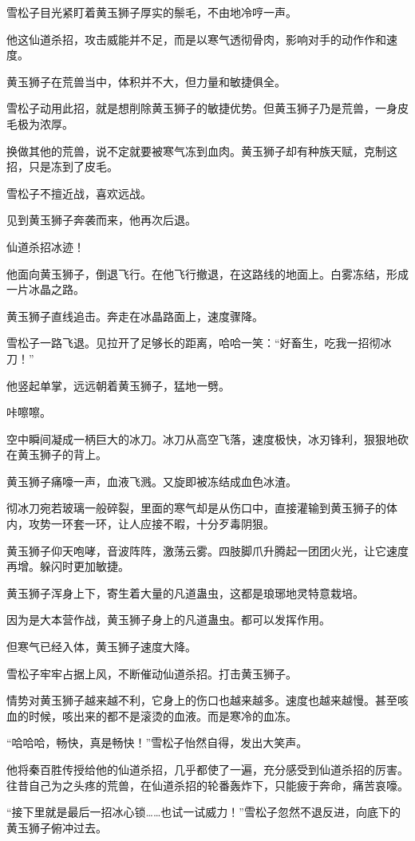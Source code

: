 \begin{this_body}
雪松子目光紧盯着黄玉狮子厚实的鬃毛，不由地冷哼一声。

他这仙道杀招，攻击威能并不足，而是以寒气透彻骨肉，影响对手的动作作和速度。

黄玉狮子在荒兽当中，体积并不大，但力量和敏捷俱全。

雪松子动用此招，就是想削除黄玉狮子的敏捷优势。但黄玉狮子乃是荒兽，一身皮毛极为浓厚。

换做其他的荒兽，说不定就要被寒气冻到血肉。黄玉狮子却有种族天赋，克制这招，只是冻到了皮毛。

雪松子不擅近战，喜欢远战。

见到黄玉狮子奔袭而来，他再次后退。

仙道杀招冰迹！

他面向黄玉狮子，倒退飞行。在他飞行撤退，在这路线的地面上。白雾冻结，形成一片冰晶之路。

黄玉狮子直线追击。奔走在冰晶路面上，速度骤降。

雪松子一路飞退。见拉开了足够长的距离，哈哈一笑：“好畜生，吃我一招彻冰刀！”

他竖起单掌，远远朝着黄玉狮子，猛地一劈。

咔嚓嚓。

空中瞬间凝成一柄巨大的冰刀。冰刀从高空飞落，速度极快，冰刃锋利，狠狠地砍在黄玉狮子的背上。

黄玉狮子痛嚎一声，血液飞溅。又旋即被冻结成血色冰渣。

彻冰刀宛若玻璃一般碎裂，里面的寒气却是从伤口中，直接灌输到黄玉狮子的体内，攻势一环套一环，让人应接不暇，十分歹毒阴狠。

黄玉狮子仰天咆哮，音波阵阵，激荡云雾。四肢脚爪升腾起一团团火光，让它速度再增。躲闪时更加敏捷。

黄玉狮子浑身上下，寄生着大量的凡道蛊虫，这都是琅琊地灵特意栽培。

因为是大本营作战，黄玉狮子身上的凡道蛊虫。都可以发挥作用。

但寒气已经入体，黄玉狮子速度大降。

雪松子牢牢占据上风，不断催动仙道杀招。打击黄玉狮子。

情势对黄玉狮子越来越不利，它身上的伤口也越来越多。速度也越来越慢。甚至咳血的时候，咳出来的都不是滚烫的血液。而是寒冷的血冻。

“哈哈哈，畅快，真是畅快！”雪松子怡然自得，发出大笑声。

他将秦百胜传授给他的仙道杀招，几乎都使了一遍，充分感受到仙道杀招的厉害。往昔自己为之头疼的荒兽，在仙道杀招的轮番轰炸下，只能疲于奔命，痛苦哀嚎。

“接下里就是最后一招冰心锁……也试一试威力！”雪松子忽然不退反进，向底下的黄玉狮子俯冲过去。


\end{this_body}
